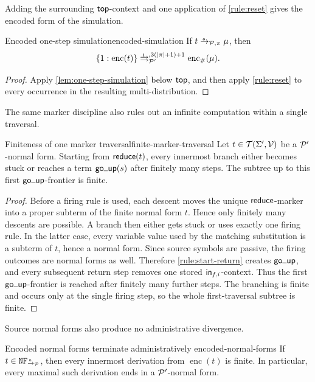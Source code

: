 Adding the surrounding \(\ttop\)-context and one application of
\eqref{rule:reset} gives the encoded form of the simulation.

\begin{Corollary}{Encoded one-step simulation}{encoded-simulation}
  If \(t\oto_{\P,\pi}\mu\), then
  \[
    \{1:\operatorname{enc}(t)\}
      \iliftto_{\P'}^{,3(|\pi|+1)+1}
      \operatorname{enc}_{\#}(\mu).
  \]
\end{Corollary}

\begin{proof}
  Apply \cref{lem:one-step-simulation} below \(\ttop\), and then apply
  \eqref{rule:reset} to every occurrence in the resulting
  multi-distribution.
\end{proof}

The same marker discipline also rules out an infinite computation within a
single traversal.

\begin{Lemma}{Finiteness of one marker traversal}{finite-marker-traversal}
  Let \(t\in\TSet{\Sigma'}{\Var}\) be a \(\P'\)-normal form.  Starting from
  \(\treduce(t)\), every innermost branch either becomes stuck or reaches a
  term \(\tgoup(s)\) after finitely many steps.  The subtree up to this first
  \(\tgoup\)-frontier is finite.
\end{Lemma}

\begin{proof}
  Before a firing rule is used, each descent moves the unique
  \(\treduce\)-marker into a proper subterm of the finite normal form \(t\).
  Hence only finitely many descents are possible.  A branch then either gets
  stuck or uses exactly one firing rule.  In the latter case, every variable
  value used by the matching substitution is a subterm of \(t\), hence a
  normal form.  Since source symbols are passive, the firing outcomes are
  normal forms as well.  Therefore \eqref{rule:start-return} creates
  \(\tgoup\), and every subsequent return
  step removes one stored \(\tin_{f,i}\)-context.  Thus the first
  \(\tgoup\)-frontier is reached after finitely many further steps.  The
  branching is finite and occurs only at the single firing step, so the whole
  first-traversal subtree is finite.
\end{proof}

Source normal forms also produce no administrative divergence.

\begin{Lemma}{Encoded normal forms terminate administratively}
  {encoded-normal-forms}
  If \(t\in\NF_{\oto_{\P}}\), then every innermost derivation from
  \(\operatorname{enc}(t)\) is finite.  In particular, every maximal such
  derivation ends in a \(\P'\)-normal form.
\end{Lemma}

